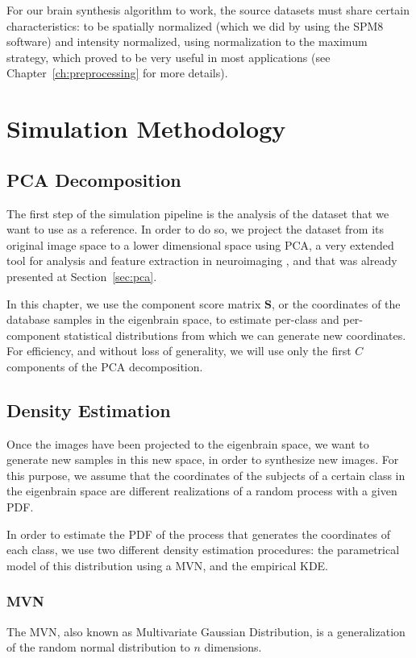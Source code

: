 For our brain synthesis algorithm to work, the source datasets must share certain characteristics: to be spatially normalized (which we did by using the SPM8 software) and intensity normalized, using normalization to the maximum strategy, which proved to be very useful in most applications \cite{Martinez-Murcia20129676,martinez2014parametrization} (see Chapter~\ref{ch:preprocessing} for more details).

\section{Simulation Methodology}
\subsection{\acs{PCA} Decomposition}
The first step of the simulation pipeline is the analysis of the dataset that we want to use as a reference. In order to do so, we project the dataset from its original image space to a lower dimensional space using \ac{PCA}, a very extended tool for analysis and feature extraction in neuroimaging \cite{Illan2011,Khedher2015}, and that was already presented at Section~\ref{sec:pca}.

In this chapter, we use the component score matrix $\mathbf{S}$, or the coordinates of the database samples in the eigenbrain space, to estimate per-class and per-component statistical distributions from which we can generate new coordinates. For efficiency, and without loss of generality, we will use only the first $C$ components of the \ac{PCA} decomposition. 

\subsection{Density Estimation}
Once the images have been projected to the eigenbrain space, we want to generate new samples in this new space, in order to synthesize new images. For this purpose, we assume that the coordinates of the subjects of a certain class in the eigenbrain space are different realizations of a random process with a given \ac{PDF}. 

In order to estimate the \ac{PDF} of the process that generates the coordinates of each class, we use two different density estimation procedures: the parametrical model of this distribution using a \acf{MVN}, and the empirical \acf{KDE}. 

\subsubsection{\acf{MVN}}
The \ac{MVN}, also known as Multivariate Gaussian Distribution, is a generalization of the random normal distribution to $n$ dimensions. 

